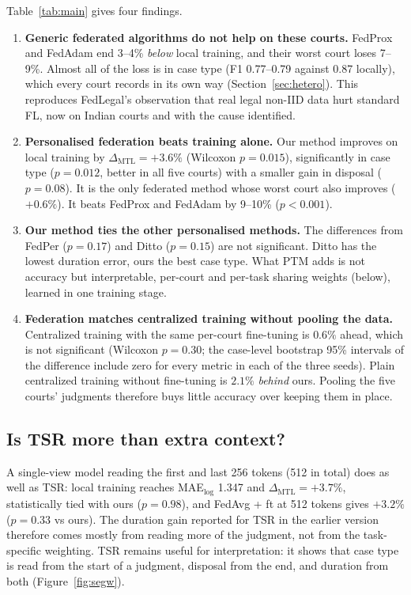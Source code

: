 Table~\ref{tab:main} gives four findings.
\begin{enumerate}
  \item \textbf{Generic federated algorithms do not help on these courts.} FedProx and FedAdam end
        3--4\% \emph{below} local training, and their worst court loses 7--9\%. Almost all of the loss is
        in case type (F1 0.77--0.79 against 0.87 locally), which every court records in its own way
        (Section~\ref{sec:hetero}). This reproduces FedLegal's observation that real legal non-IID data
        hurt standard FL, now on Indian courts and with the cause identified.
  \item \textbf{Personalised federation beats training alone.} Our method improves on local training by
        $\Delta_{\text{MTL}}=+3.6\%$ (Wilcoxon $p=0.015$), significantly in case type ($p=0.012$, better
        in all five courts) with a smaller gain in disposal ($p=0.08$). It is the only federated method
        whose worst court also improves ($+0.6\%$). It beats FedProx and FedAdam by 9--10\% ($p<0.001$).
  \item \textbf{Our method ties the other personalised methods.} The differences from FedPer
        ($p=0.17$) and Ditto ($p=0.15$) are not significant. Ditto has the lowest duration error,
        ours the best case type. What PTM adds is not accuracy but interpretable, per-court and
        per-task sharing weights (below), learned in one training stage.
  \item \textbf{Federation matches centralized training without pooling the data.} Centralized
        training with the same per-court fine-tuning is $0.6\%$ ahead, which is not significant
        (Wilcoxon $p=0.30$; the case-level bootstrap 95\% intervals of the difference include zero for
        every metric in each of the three seeds).
        Plain centralized training without fine-tuning is $2.1\%$ \emph{behind} ours. Pooling the
        five courts' judgments therefore buys little accuracy over keeping them in place.
\end{enumerate}

\subsection*{Is TSR more than extra context?}
A single-view model reading the first and last 256 tokens (512 in total) does as well as TSR:
local training reaches MAE$_{\log}$ 1.347 and $\Delta_{\text{MTL}}=+3.7\%$, statistically tied with
ours ($p=0.98$), and FedAvg + ft at 512 tokens gives $+3.2\%$ ($p=0.33$ vs ours). The duration gain
reported for TSR in the earlier version therefore comes mostly from reading more of the judgment,
not from the task-specific weighting. TSR remains useful for interpretation: it shows that case type
is read from the start of a judgment, disposal from the end, and duration from both
(Figure~\ref{fig:segw}).

